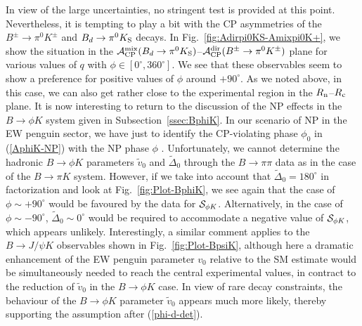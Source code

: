 \documentclass[12pt]{article}
\begin{document}
In view of the large uncertainties, no stringent test is provided at this point.
Nevertheless, it is tempting to play a bit with the CP asymmetries of the
$B^\pm\to\pi^0K^\pm$ and $B_d\to\pi^0K_{\rm S}$ decays. In 
Fig.~\ref{fig:Adirpi0KS-Amixpi0K+}, we show the situation in the 
${\cal A}_{\rm CP}^{\rm mix}(B_d\to\pi^0K_{\rm S})$--${\cal A}_{\rm CP}^{\rm dir}
(B^\pm\to\pi^0K^\pm)$ plane for various values of $q$ with $\phi\in[0^\circ,360^\circ]$.
We see that these observables seem to show a preference for positive values of 
$\phi$ around $+90^\circ$. As we noted above, in this case, we can also get 
rather close to the experimental region in the $R_{\rm n}$--$R_{\rm c}$ plane.
It is now interesting to return to the discussion of the NP effects in the
$B\to\phi K$ system given in Subsection~\ref{ssec:BphiK}. In our scenario of NP 
in the EW penguin sector, we have just to identify the CP-violating phase $\phi_0$ 
in (\ref{AphiK-NP}) with the NP phase $\phi$ \cite{BFRS3}. Unfortunately, we 
cannot determine the hadronic $B\to\phi K$ parameters $\tilde v_0$ and 
$\tilde\Delta_0$ through the $B\to\pi\pi$ data as in the case of the $B\to\pi K$ 
system. However, if we take 
into account that $\tilde\Delta_0=180^\circ$ in factorization and look at 
Fig.~\ref{fig:Plot-BphiK}, we see again that the case of $\phi\sim+90^\circ$ would 
be favoured by the data for ${\cal S}_{\phi K}$. Alternatively, in the case of 
$\phi\sim-90^\circ$, $\tilde\Delta_0\sim 0^\circ$ would be required to 
accommodate a negative value of ${\cal S}_{\phi K}$, which appears unlikely. Interestingly, a similar comment applies to the $B\to J/\psi K$ observables 
shown in Fig.~\ref{fig:Plot-BpsiK}, although here a dramatic enhancement of the 
EW penguin parameter $v_0$ relative to the SM estimate would be simultaneously
needed to reach the central experimental values, in contract to the reduction of 
$\tilde v_0$ in the $B\to\phi K$ case. In view of rare decay constraints, the behaviour 
of the $B\to \phi K$ parameter $\tilde v_0$ appears much more likely, 
thereby supporting the assumption after (\ref{phi-d-det}). 


%
%
%
\boldmath
\end{document}
